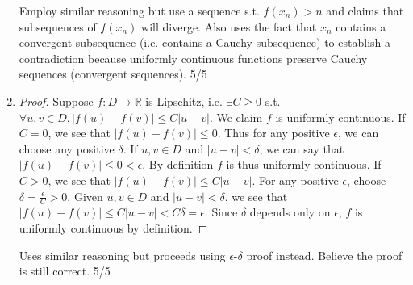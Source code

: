 \documentclass{article}
\begin{document}
\begin{enumerate}
    \color{Red}
    Employ similar reasoning but use a sequence s.t. $f(x_n) > n$ and 
    claims that subsequences of $f(x_n)$ will diverge.
    Also uses the fact that $x_n$ contains a convergent subsequence (i.e. contains a Cauchy subsequence) 
    to establish a contradiction because uniformly continuous functions preserve 
    Cauchy sequences (convergent sequences). 5/5
    \color{Black}

    \item {} 
    \begin{proof}
      Suppose $f:D\to\mathbb{R}$ is Lipschitz, i.e. $\exists C\geq 0$ s.t.
      $\forall u,v\in D, |f(u)-f(v)|\leq C|u-v|$.
      We claim $f$ is uniformly continuous.
      If $C=0$, we see that $|f(u)-f(v)| \leq 0$. 
      Thus for any positive $\epsilon$, 
      we can choose any positive $\delta$.
      If $u,v\in D$ and $|u-v| < \delta$, we can say 
      that $|f(u) - f(v)| \leq 0 < \epsilon$. By 
      definition $f$ is thus uniformly continuous.
      If $C > 0$, we see that $|f(u) - f(v)| \leq C|u-v|$.
      For any positive $\epsilon$, 
      choose $\delta = \frac{\epsilon}{C} > 0$. 
      Given $u,v\in D$ and $|u-v|<\delta$,
      we see that $|f(u) - f(v)| \leq C|u-v| < C\delta = \epsilon$.
      Since $\delta$ depends only on $\epsilon$, 
      $f$ is uniformly continuous by definition.
    \end{proof}

    \color{Red}
    Uses similar reasoning but 
    proceeds using $\epsilon$-$\delta$ proof instead.
    Believe the proof is still correct. 5/5
    \color{Black}


\end{enumerate}
\end{document}
